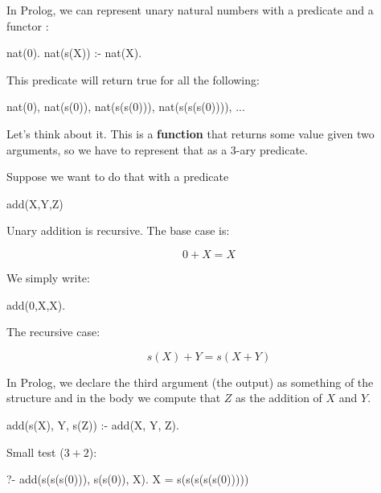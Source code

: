 In Prolog, we can represent unary natural numbers with a predicate  and a functor :

\begin{codeblock}
nat(0).             %
nat(s(X)) :- nat(X).  %
\end{codeblock}

This predicate will return true for all the following:

\begin{codeblock}
nat(0), nat(s(0)), nat(s(s(0))), nat(s(s(s(0)))), ... 
\end{codeblock}


Let's think about it. This is a \textbf{function} that returns some value given two arguments, so we have to represent that as a $3$-ary predicate.

Suppose we want to do that with a predicate 

\begin{codeblock}
add(X,Y,Z)        %
\end{codeblock}

Unary addition is recursive. The base case is:

\[
0 + X = X
\]

We simply write:
\begin{codeblock}
add(0,X,X).
\end{codeblock}

The recursive case:

\[
s(X) + Y = s(X + Y)
\]

In Prolog, we declare the third argument (the output) as something of the structure  and in the body we compute that $Z$ as the addition of $X$ and $Y$.

\begin{codeblock}
add(s(X), Y, s(Z)) :- add(X, Y, Z).
\end{codeblock}

Small test ($3 + 2$):

\begin{codeblock}
?- add(s(s(s(0))), s(s(0)), X).
X = s(s(s(s(s(0)))))
\end{codeblock}



